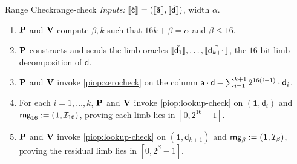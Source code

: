 \begin{DefinePIOP}{Range Check}{range-check}
  \emph{Inputs:} $\llbracket\hat{\mathsf{c}}\rrbracket = (\llbracket\tilde{\mathsf{a}}\rrbracket, \llbracket\tilde{\mathsf{d}}\rrbracket)$, width $\alpha$.
  \begin{enumerate}[nosep]
    \item $\bf{P}$ and $\bf{V}$ compute $\beta, k$ such that $16k + \beta = \alpha$ and $\beta \leq 16$.
    \item $\bf{P}$ constructs and sends the limb oracles $\llbracket\tilde{\mathsf{d}_1}\rrbracket, \ldots, \llbracket\tilde{\mathsf{d}_{k+1}}\rrbracket$, the $16$-bit limb decomposition of $\mathsf{d}$.
    \item $\bf{P}$ and $\bf{V}$ invoke \cref{piop:zerocheck} on the column $\mathsf{a}\cdot\mathsf{d} - \sum_{i=1}^{k+1} 2^{16(i-1)}\cdot\mathsf{d}_i$.
    \item For each $i = 1, \dots, k$, $\bf{P}$ and $\bf{V}$ invoke \cref{piop:lookup-check} on $(\mathbf{1}, \mathsf{d}_i)$ and $\mathsf{rng}_{16} := (\mathbf{1}, \mathcal{I}_{16})$, proving each limb lies in $[0, 2^{16}-1]$.
    \item $\bf{P}$ and $\bf{V}$ invoke \cref{piop:lookup-check} on $(\mathbf{1}, \mathsf{d}_{k+1})$ and $\mathsf{rng}_\beta := (\mathbf{1}, \mathcal{I}_\beta)$, proving the residual limb lies in $[0, 2^\beta-1]$.
  \end{enumerate}
\end{DefinePIOP}

